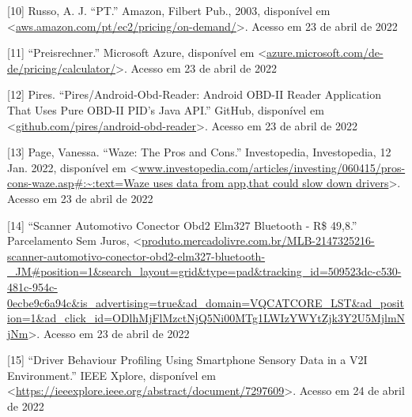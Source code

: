 [10] Russo, A. J. “PT.” Amazon, Filbert Pub., 2003, disponível em <\url{aws.amazon.com/pt/ec2/pricing/on-demand/}>. Acesso em 23 de abril de 2022


[11] “Preisrechner.” Microsoft Azure, disponível em <\url{azure.microsoft.com/de-de/pricing/calculator/}>. Acesso em 23 de abril de 2022

[12] Pires. “Pires/Android-Obd-Reader: Android OBD-II Reader Application That Uses Pure OBD-II PID's Java API.” GitHub, disponível em <\url{github.com/pires/android-obd-reader}>. Acesso em 23 de abril de 2022

[13] Page, Vanessa. “Waze: The Pros and Cons.” Investopedia, Investopedia, 12 Jan. 2022, disponível em <\url{www.investopedia.com/articles/investing/060415/pros-cons-waze.asp#:~:text=Waze uses data from app,that could slow down drivers}>. Acesso em 23 de abril de 2022


[14] “Scanner Automotivo Conector Obd2 Elm327 Bluetooth - R\$ 49,8.” Parcelamento Sem Juros, <\url{produto.mercadolivre.com.br/MLB-2147325216-scanner-automotivo-conector-obd2-elm327-bluetooth-_JM#position=1&search_layout=grid&type=pad&tracking_id=509523dc-c530-481c-954c-0ecbe9c6a94c&is_advertising=true&ad_domain=VQCATCORE_LST&ad_position=1&ad_click_id=ODlhMjFlMzctNjQ5Ni00MTg1LWIzYWYtZjk3Y2U5MjlmNjNm}>. Acesso em 23 de abril de 2022

[15] “Driver Behaviour Profiling Using Smartphone Sensory Data in a V2I Environment.” IEEE Xplore, disponível em <\url{https://ieeexplore.ieee.org/abstract/document/7297609}>. Acesso em 24 de abril de 2022

